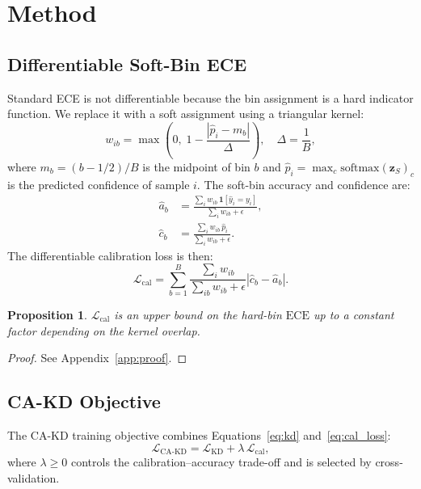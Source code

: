 \documentclass{article}
\newtheorem{proposition}{Proposition}
\newcommand{\cL}{\mathcal{L}}
\newcommand{\ECE}{\mathrm{ECE}}
\newcommand{\softmax}{\mathrm{softmax}}
\newcommand{\abs}[1]{\left|#1\right|}
\begin{document}
\section{Method}
\label{sec:method}

\subsection{Differentiable Soft-Bin ECE}

Standard ECE is not differentiable because the bin assignment is a hard indicator function.
We replace it with a soft assignment using a triangular kernel:
\begin{equation}
  w_{ib} = \max\!\left(0,\; 1 - \frac{|\hat{p}_i - m_b|}{\Delta}\right),
  \quad \Delta = \frac{1}{B},
\end{equation}
where $m_b = (b - 1/2)/B$ is the midpoint of bin $b$ and
$\hat{p}_i = \max_c \softmax(\mathbf{z}_S)_c$ is the predicted confidence of sample $i$.
The soft-bin accuracy and confidence are:
\begin{align}
  \hat{a}_b &= \frac{\sum_i w_{ib}\,\mathbf{1}[\hat{y}_i = y_i]}{\sum_i w_{ib} + \epsilon}, \\
  \hat{c}_b &= \frac{\sum_i w_{ib}\,\hat{p}_i}{\sum_i w_{ib} + \epsilon}.
\end{align}
The differentiable calibration loss is then:
\begin{equation}
  \cL_\text{cal} = \sum_{b=1}^{B}
    \frac{\sum_i w_{ib}}{\sum_{ib} w_{ib} + \epsilon}
    \abs{\hat{c}_b - \hat{a}_b}.
  \label{eq:cal_loss}
\end{equation}

\begin{proposition}
$\cL_\mathrm{cal}$ is an upper bound on the hard-bin $\ECE$ up to a constant factor depending on
the kernel overlap.
\end{proposition}
\begin{proof}
  See Appendix~\ref{app:proof}.
\end{proof}

\subsection{CA-KD Objective}

The CA-KD training objective combines Equations~\eqref{eq:kd} and~\eqref{eq:cal_loss}:
\begin{equation}
  \boxed{\cL_\text{CA-KD} = \cL_\text{KD} + \lambda\,\cL_\text{cal}},
  \label{eq:cakd}
\end{equation}
where $\lambda \geq 0$ controls the calibration–accuracy trade-off and is selected by
cross-validation.
\end{document}
